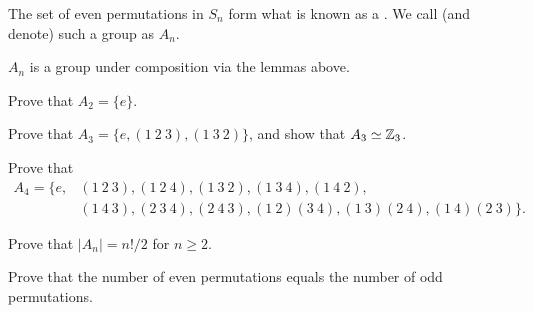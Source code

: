 \documentclass{ximera}
\begin{document}
\begin{definition}
  The set of even permutations in $S_n$ form what is known as a
  . We call (and denote) such a group as $A_n$.
\end{definition}

\begin{remark}
  $A_n$ is a group under composition via the lemmas above.
\end{remark}

\begin{exercise}
  Prove that $A_2 = \{e\}$.
\end{exercise}

\begin{exercise}
  Prove that $A_3 = \{e,(1\ 2\ 3), (1\ 3\ 2)\}$, and show that
  $A_3\simeq \mathbb Z_3$.
\end{exercise}

\begin{exercise}
  Prove that
  \begin{align*}
    A_4 =\{e, &(1\ 2\ 3), (1\ 2\ 4), (1\ 3 \ 2), (1\ 3\ 4),  (1\ 4\ 2),  \\
    &(1\ 4\ 3),(2 \ 3 \ 4), (2 \ 4 \ 3), (1\ 2)(3 \ 4), (1\ 3)(2\ 4),(1\ 4)(2\ 3)\}.
  \end{align*}
\end{exercise}


\begin{exercise}
  Prove that $|A_n| = n!/2$ for $n\ge 2$.
  \begin{hint}
    Prove that the number of even permutations equals the number of
    odd permutations.
  \end{hint}
\end{exercise}
\end{document}
